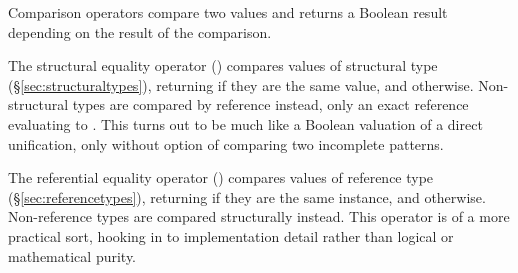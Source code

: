 \begin{prooftree}
\end{prooftree}

\begin{prooftree}
\end{prooftree}

\begin{prooftree}
\end{prooftree}

Comparison operators compare two values and returns a Boolean result depending
on the result of the comparison.

The structural equality operator (\op{==}) compares values of structural type
(\S\ref{sec:structuraltypes}), returning  if they are the same value,
and  otherwise. Non-structural types are compared by reference
instead, only an exact reference evaluating to . This turns out to
be much like a Boolean valuation of a direct unification, only without option
of comparing two incomplete patterns.

\begin{prooftree}
\end{prooftree}

\begin{prooftree}
\end{prooftree}

The referential equality operator (\op{===}) compares values of reference type
(\S\ref{sec:referencetypes}), returning  if they are the same instance,
and  otherwise. Non-reference types are compared structurally instead.
This operator is of a more practical sort, hooking in to implementation detail
rather than logical or mathematical purity.

